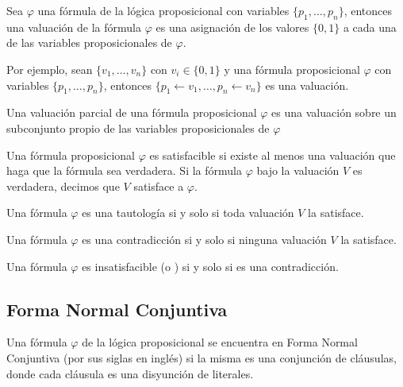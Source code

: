 \begin{definition}
 Sea $\varphi$ una fórmula de la lógica proposicional con variables $\{p_1, \ldots, p_n\}$, entonces una valuación de la fórmula $\varphi$ es una asignación de los valores $\{0, 1\}$ a cada una de las variables proposicionales de $\varphi$.
\end{definition}

Por ejemplo, sean $\{v_1, \ldots, v_n\}$ con $v_i \in \{0, 1\}$ y una fórmula proposicional $\varphi$ con variables $\{p_1, \ldots, p_n\}$, entonces $\{p_1 \leftarrow v_1, \ldots, p_n \leftarrow v_n\}$ es una valuación.

\begin{definition}
 Una valuación parcial de una fórmula proposicional $\varphi$ es una valuación sobre un subconjunto propio de las variables proposicionales de $\varphi$
\end{definition}

\begin{definition}
 Una fórmula proposicional $\varphi$ es satisfacible si existe al menos una valuación que haga que la fórmula sea verdadera. Si la fórmula $\varphi$ bajo la valuación $V$ es verdadera, decimos que $V$ satisface a $\varphi$.
\end{definition}

\begin{definition}
 Una fórmula $\varphi$ es una tautología si y solo si toda valuación $V$ la satisface.
\end{definition}

\begin{definition}
 Una fórmula $\varphi$ es una contradicción si y solo si ninguna valuación $V$ la satisface.
\end{definition}

\begin{definition}
 Una fórmula $\varphi$ es insatisfacible (o \unsat) si y solo si es una contradicción.
\end{definition}


\subsection{Forma Normal Conjuntiva}

\begin{definition}  Una fórmula $\varphi$ de
la lógica proposicional se encuentra en Forma Normal Conjuntiva (\cnf por sus
siglas en inglés) si la misma es una conjunción de cláusulas, donde cada
cláusula es una disyunción de literales. \end{definition}

